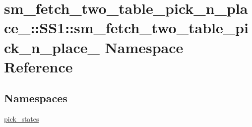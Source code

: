 \hypertarget{namespacesm__fetch__two__table__pick__n__place__1_1_1SS1_1_1sm__fetch__two__table__pick__n__place__1}{}\section{sm\+\_\+fetch\+\_\+two\+\_\+table\+\_\+pick\+\_\+n\+\_\+place\+\_\+:\+:S\+S1\+:\+:sm\+\_\+fetch\+\_\+two\+\_\+table\+\_\+pick\+\_\+n\+\_\+place\+\_ Namespace Reference}
\label{namespacesm__fetch__two__table__pick__n__place__1_1_1SS1_1_1sm__fetch__two__table__pick__n__place__1}
\subsection*{Namespaces}
\begin{DoxyCompactItemize}
\item 
 \hyperlink{namespacesm__fetch__two__table__pick__n__place__1_1_1SS1_1_1sm__fetch__two__table__pick__n__place__1_1_1pick__states}{pick\+\_\+states}
\end{DoxyCompactItemize}
